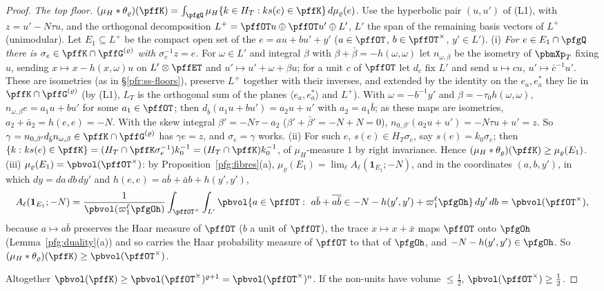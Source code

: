 \documentclass[10pt]{amsart}
\theoremstyle{definition}
\theoremstyle{remark}
\begin{document}
\begin{proof}
\emph{The top floor.} $(\mu_H\ast\theta_\varrho)(\pffK)=\int_{\pfgQ}\mu_H\{k\in H_T:ks(e)\in\pffK\}\,d\mu_\varrho(e)$. Use the hyperbolic
pair $(u,u')$ of (L1), with $z=u'-N\tau u$, and the orthogonal decomposition $L^+=\pffOT u\oplus\pffOT u'\oplus L'$, $L'$ the
span of the remaining basis vectors of $L^+$ (unimodular). Let $E_1\subseteq L^+$ be the compact open set of the
$e=au+bu'+y'$ ($a\in\pffOT$, $b\in\pffOT^\times$, $y'\in L'$). (i) \emph{For $e\in E_1\cap\pfgQ$ there is $\sigma_e\in\pffK\cap
\pffG^{(\varrho)}$ with $\sigma_e^{-1}z=e$.} For $\omega\in L'$ and integral $\beta$ with $\beta+\bar\beta=-h(\omega,\omega)$ let
$n_{\omega,\beta}$ be the isometry of $\pbmXp_T$ fixing $u$, sending $x\mapsto x-h(x,\omega)u$ on $L'\otimes\pffET$ and
$u'\mapsto u'+\omega+\beta u$; for a unit $c$ of $\pffOT$ let $d_c$ fix $L'$ and send $u\mapsto cu$, $u'\mapsto\bar c^{-1}u'$. These
are isometries (as in \S\ref{pfr:ss-floors}), preserve $L^+$ together with their inverses, and extended by the identity on
the $e_a,e_a^*$ they lie in $\pffK\cap\pffG^{(\varrho)}$ (by (L1), $L_T$ is the orthogonal sum of the planes $\langle e_a,e_a^*\rangle$
and $L^+$). With $\omega=-b^{-1}y'$ and $\beta=-\tau_0h(\omega,\omega)$, $n_{\omega,\beta}e=a_1u+bu'$ for some $a_1\in\pffOT$; then
$d_{\bar b}(a_1u+bu')=a_2u+u'$ with $a_2=a_1\bar b$; as these maps are isometries, $a_2+\bar a_2=h(e,e)=-N$. With the skew
integral $\beta'=-N\tau-a_2$ ($\beta'+\bar\beta'=-N+N=0$), $n_{0,\beta'}(a_2u+u')=-N\tau u+u'=z$. So $\gamma=n_{0,\beta'}d_{\bar b}
n_{\omega,\beta}\in\pffK\cap\pffG^{(\varrho)}$ has $\gamma e=z$, and $\sigma_e=\gamma$ works. (ii) For such $e$, $s(e)\in H_T\sigma_e$, say
$s(e)=k_0\sigma_e$; then $\{k:ks(e)\in\pffK\}=(H_T\cap\pffK\sigma_e^{-1})k_0^{-1}=(H_T\cap\pffK)k_0^{-1}$, of $\mu_H$-measure $1$ by
right invariance. Hence $(\mu_H\ast\theta_\varrho)(\pffK)\ge\mu_\varrho(E_1)$. (iii) $\mu_\varrho(E_1)=\pbvol(\pffOT^\times)$: by
Proposition~\ref{pfg:fibres}(a), $\mu_\varrho(E_1)=\lim_\ell A_\ell(\mathbf 1_{E_1};-N)$, and in the coordinates $(a,b,y')$, in which
$dy=da\,db\,dy'$ and $h(e,e)=a\bar b+\bar ab+h(y',y')$,
\[
A_\ell(\mathbf 1_{E_1};-N)=\frac1{\pbvol(\varpi_1^\ell\pfgOh)}\int_{\pffOT^\times}\int_{L'}\pbvol\{a\in\pffOT:\
a\bar b+\overline{a\bar b}\in-N-h(y',y')+\varpi_1^\ell\pfgOh\}\,dy'\,db=\pbvol(\pffOT^\times),
\]
because $a\mapsto a\bar b$ preserves the Haar measure of $\pffOT$ ($b$ a unit of $\pffOT$), the trace $x\mapsto x+\bar x$ maps
$\pffOT$ onto $\pfgOh$ (Lemma~\ref{pfg:duality}(a)) and so carries the Haar probability measure of $\pffOT$ to that of $\pfgOh$, and
$-N-h(y',y')\in\pfgOh$. So $(\mu_H\ast\theta_\varrho)(\pffK)\ge\pbvol(\pffOT^\times)$.

Altogether $\pbvol(\pffK)\ge\pbvol(\pffOT^\times)^{\varrho+1}=\pbvol(\pffOT^\times)^n$. If the non-units have volume $\le\frac12$,
$\pbvol(\pffOT^\times)\ge\frac12$.
\end{proof}
\end{document}
